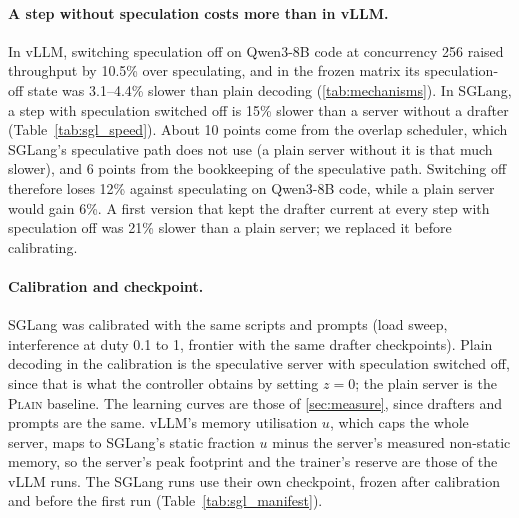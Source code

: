 \documentclass{article}
\newcommand{\pol}[1]{\textsc{#1}}
\begin{document}
\paragraph{A step without speculation costs more than in vLLM.} In vLLM, switching speculation off on Qwen3-8B code at concurrency 256 raised throughput by 10.5\% over speculating, and in the frozen matrix its speculation-off state was 3.1--4.4\% slower than plain decoding (\cref{tab:mechanisms}). In SGLang, a step with speculation switched off is 15\% slower than a server without a drafter (Table~\ref{tab:sgl_speed}). About 10 points come from the overlap scheduler, which SGLang's speculative path does not use (a plain server without it is that much slower), and 6 points from the bookkeeping of the speculative path. Switching off therefore loses 12\% against speculating on Qwen3-8B code, while a plain server would gain 6\%. A first version that kept the drafter current at every step with speculation off was 21\% slower than a plain server; we replaced it before calibrating.

\paragraph{Calibration and checkpoint.} SGLang was calibrated with the same scripts and prompts (load sweep, interference at duty 0.1 to 1, frontier with the same drafter checkpoints). Plain decoding in the calibration is the speculative server with speculation switched off, since that is what the controller obtains by setting $z{=}0$; the plain server is the \pol{Plain} baseline. The learning curves are those of \cref{sec:measure}, since drafters and prompts are the same. vLLM's memory utilisation $u$, which caps the whole server, maps to SGLang's static fraction $u$ minus the server's measured non-static memory, so the server's peak footprint and the trainer's reserve are those of the vLLM runs. The SGLang runs use their own checkpoint, frozen after calibration and before the first run (Table~\ref{tab:sgl_manifest}).
\end{document}
